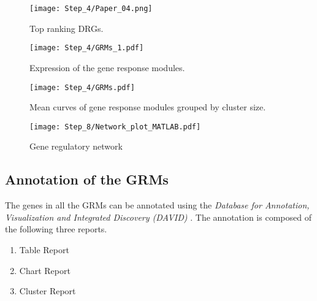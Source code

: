 \begin{figure}
\texttt{[image: Step\_4/Paper\_04.png]}
\caption{Top ranking DRGs.}
\label{figure:drgs}
\end{figure}

\begin{figure}
\texttt{[image: Step\_4/GRMs\_1.pdf]}
\caption{Expression of the gene response modules.}
\label{figure:grms}
\end{figure}

\begin{figure}
\texttt{[image: Step\_4/GRMs.pdf]}
\caption{Mean curves of gene response modules grouped by cluster size.}
\label{figure:grmstype}
\end{figure}

\begin{figure}
\texttt{[image: Step\_8/Network\_plot\_MATLAB.pdf]}
\caption{Gene regulatory network}
\label{fig:generegnet}
\end{figure}



\subsection{Annotation of the GRMs}
\label{section:results2}

The genes in all the GRMs can be annotated using the \textit{Database for Annotation, Visualization and Integrated Discovery (DAVID)} \cite{huang2009systematic,huang2009bioinformatics}. The annotation is composed of the following three reports.

\begin{enumerate}
\setlength{\itemsep}{-1ex}
   \item Table Report
   \item Chart Report
   \item Cluster Report
\end{enumerate}

